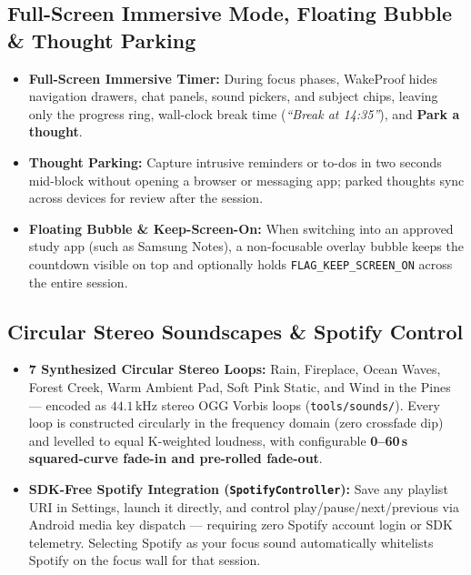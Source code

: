 \documentclass[11pt,a4paper]{article}
\begin{document}
\subsection{Full-Screen Immersive Mode, Floating Bubble \& Thought Parking}
\begin{itemize}
  \item \textbf{Full-Screen Immersive Timer:} During focus phases, WakeProof hides navigation drawers, chat panels, sound pickers, and subject chips, leaving only the progress ring, wall-clock break time (\emph{``Break at 14:35''}), and \textbf{Park a thought}.
  \item \textbf{Thought Parking:} Capture intrusive reminders or to-dos in two seconds mid-block without opening a browser or messaging app; parked thoughts sync across devices for review after the session.
  \item \textbf{Floating Bubble \& Keep-Screen-On:} When switching into an approved study app (such as Samsung Notes), a non-focusable overlay bubble keeps the countdown visible on top and optionally holds \texttt{FLAG\_KEEP\_SCREEN\_ON} across the entire session.
\end{itemize}

\subsection{Circular Stereo Soundscapes \& Spotify Control}
\begin{itemize}
  \item \textbf{7 Synthesized Circular Stereo Loops:} Rain, Fireplace, Ocean Waves, Forest Creek, Warm Ambient Pad, Soft Pink Static, and Wind in the Pines --- encoded as $44.1\,\text{kHz}$ stereo OGG Vorbis loops (\texttt{tools/sounds/}). Every loop is constructed circularly in the frequency domain (zero crossfade dip) and levelled to equal K-weighted loudness, with configurable \textbf{0--60\,s squared-curve fade-in and pre-rolled fade-out}.
  \item \textbf{SDK-Free Spotify Integration (\texttt{SpotifyController}):} Save any playlist URI in Settings, launch it directly, and control play/pause/next/previous via Android media key dispatch --- requiring zero Spotify account login or SDK telemetry. Selecting Spotify as your focus sound automatically whitelists Spotify on the focus wall for that session.
\end{itemize}
\end{document}
